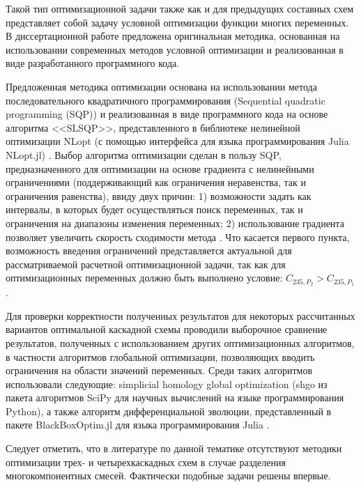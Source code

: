 {Такой тип оптимизационной задачи также как и для предыдущих составных схем представляет собой задачу условной оптимизации функции многих переменных. В диссертационной работе предложена оригинальная методика, основанная на использовании современных методов условной оптимизации и реализованная в виде разработанного программного кода.

Предложенная методика оптимизации основана на использовании метода последовательного квадратичного программирования (Sequential quadratic programming (SQP)) и реализованная в виде программного кода на основе алгоритма <<SLSQP>>, представленного в библиотеке нелинейной оптимизации NLopt (с помощью интерфейса для языка программирования Julia NLopt.jl) \cite{NLopt}. Выбор алгоритма оптимизации сделан в пользу SQP, предназначенного для оптимизации на основе градиента с нелинейными ограничениями (поддерживающий как ограничения неравенства, так и ограничения равенства), ввиду двух причин: 1) возможности задать как интервалы, в которых будет осуществляться поиск переменных, так и ограничения на диапазоны изменения переменных; 2) использование градиента позволяет увеличить скорость сходимости метода \cite{NumericalOptimization2006}. Что касается первого пункта, возможность введения ограничений представляется актуальной для рассматриваемой расчетной оптимизационной задачи, так как для оптимизационных переменных должно быть выполнено условие: ${C_{235,{P_2}}}>{C_{235,{P_1}}}$. 

Для проверки корректности полученных результатов для некоторых рассчитанных вариантов оптимальной каскадной схемы проводили выборочное сравнение результатов, полученных с использованием других оптимизационных алгоритмов, в частности алгоритмов глобальной оптимизации, позволяющих вводить ограничения на области значений переменных. Среди таких алгоритмов использовали следующие: simplicial homology global optimization (shgo из пакета алгоритмов SciPy для научных вычислений на языке программирования Python), а также алгоритм дифференциальной эволюции, представленный в пакете BlackBoxOptim.jl для языка программирования Julia \cite{пантелеевМетаэвристическиеАлгоритмыПоиска2009,virtanenSciPyFundamentalAlgorithms2020,endresSimplicialHomologyAlgorithm2018,mogensenOptimMathematicalOptimization2018,storn1997differential,Price-et-al-differential-evolution-2005,Feldt2018}.

Следует отметить, что в литературе по данной тематике отсутствуют методики оптимизации трех- и четырехкаскадных схем в случае разделения многокомпонентных смесей. Фактически подобные задачи решены впервые.

}
